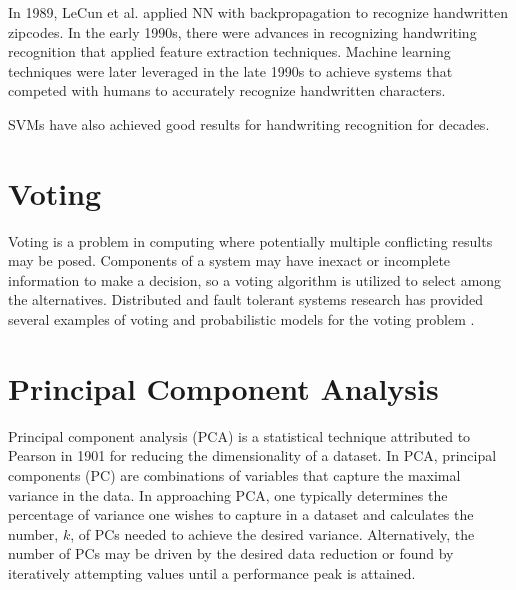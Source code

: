 In 1989, LeCun et al. applied NN with backpropagation to recognize handwritten
zipcodes\cite{lecun1989handwritten}. In the early 1990s, there were advances in
recognizing handwriting recognition that applied feature extraction techniques.
Machine learning techniques were later leveraged in the late 1990s to achieve
systems that competed with humans to accurately recognize handwritten
characters.

SVMs have also achieved good results for handwriting recognition for
decades\cite{schiilkop1995extracting, decoste2002training}.

\section{Voting}

Voting is a problem in computing where potentially multiple conflicting results
may be posed. Components of a system may have inexact or incomplete information
to make a decision, so a voting algorithm is utilized to select among the
alternatives\cite{parhami1994voting, BENNETT19998787}. Distributed and fault
tolerant systems research has provided several examples of voting
\cite{avizienis} and probabilistic models for the voting problem \cite{blough}.

\section{Principal Component Analysis}

Principal component analysis (PCA) is a statistical technique attributed to
Pearson in 1901\cite{Pearson01111901} for reducing the dimensionality of a
dataset. In PCA, principal components (PC) are combinations of variables that
capture the maximal variance in the data. In approaching
PCA, one typically determines the percentage of variance one wishes to capture
in a dataset and calculates the number, $k$, of PCs needed to achieve the
desired variance. Alternatively, the number of PCs may be driven by the desired
data reduction or found by iteratively attempting values until a performance
peak is attained\cite{abdi2010principal, 7053842}.



